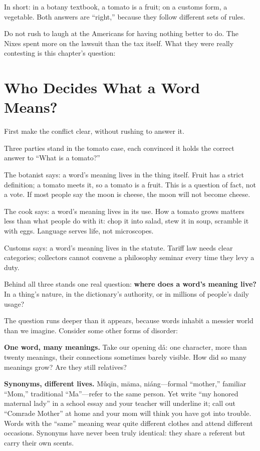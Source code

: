 In short: in a botany textbook, a tomato is a fruit; on a customs form, a vegetable. Both answers are ``right,'' because they follow different sets of rules.

Do not rush to laugh at the Americans for having nothing better to do. The Nixes spent more on the lawsuit than the tax itself. What they were really contesting is this chapter's question:

\section{Who Decides What a Word Means?}
First make the conflict clear, without rushing to answer it.

Three parties stand in the tomato case, each convinced it holds the correct answer to ``What is a tomato?''

The botanist says: a word's meaning lives in the thing itself. Fruit has a strict definition; a tomato meets it, so a tomato is a fruit. This is a question of fact, not a vote. If most people say the moon is cheese, the moon will not become cheese.

The cook says: a word's meaning lives in its use. How a tomato grows matters less than what people do with it: chop it into salad, stew it in soup, scramble it with eggs. Language serves life, not microscopes.

Customs says: a word's meaning lives in the statute. Tariff law needs clear categories; collectors cannot convene a philosophy seminar every time they levy a duty.

Behind all three stands one real question: \textbf{where does a word's meaning live?} In a thing's nature, in the dictionary's authority, or in millions of people's daily usage?

The question runs deeper than it appears, because words inhabit a messier world than we imagine. Consider some other forms of disorder:

\textbf{One word, many meanings.} Take our opening dǎ: one character, more than twenty meanings, their connections sometimes barely visible. How did so many meanings grow? Are they still relatives?

\textbf{Synonyms, different lives.} Mǔqīn, māma, niáng---formal ``mother,'' familiar ``Mom,'' traditional ``Ma''---refer to the same person. Yet write ``my honored maternal lady'' in a school essay and your teacher will underline it; call out ``Comrade Mother'' at home and your mom will think you have got into trouble. Words with the ``same'' meaning wear quite different clothes and attend different occasions. Synonyms have never been truly identical: they share a referent but carry their own scents.

